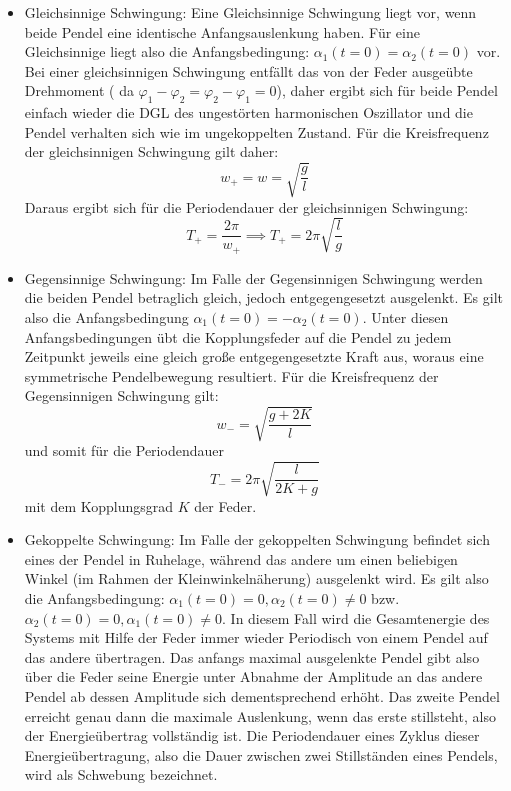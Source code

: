\begin{itemize}
\item Gleichsinnige Schwingung: \newline
Eine Gleichsinnige Schwingung liegt vor, wenn beide Pendel eine identische Anfangsauslenkung haben. Für eine Gleichsinnige liegt also die Anfangsbedingung: $\alpha_1(t=0)=\alpha_2(t=0)$ vor. Bei einer gleichsinnigen Schwingung entfällt das von der Feder ausgeübte Drehmoment ( da $\varphi_1-\varphi_2=\varphi_2-\varphi_1=0$), daher ergibt sich für beide Pendel einfach wieder die DGL des ungestörten harmonischen Oszillator und die Pendel verhalten sich wie im ungekoppelten Zustand. Für die Kreisfrequenz der gleichsinnigen Schwingung gilt daher:
\begin{equation}
w_+=w=\sqrt{\frac{g}{l}}
\end{equation}
Daraus ergibt sich für die Periodendauer der gleichsinnigen Schwingung:
\begin{equation}
T_+=\frac{2\pi}{w_+} \implies T_+=2\pi\sqrt{\frac{l}{g}}
\end{equation}
\item Gegensinnige Schwingung: \newline
Im Falle der Gegensinnigen Schwingung werden die beiden Pendel betraglich gleich, jedoch entgegengesetzt ausgelenkt. Es gilt also die Anfangsbedingung $\alpha_1(t=0)=-\alpha_2(t=0)$. Unter diesen Anfangsbedingungen übt die Kopplungsfeder auf die Pendel zu jedem Zeitpunkt jeweils eine gleich große entgegengesetzte Kraft aus, woraus eine symmetrische Pendelbewegung resultiert. Für die Kreisfrequenz der Gegensinnigen Schwingung gilt:
\begin{equation}
w_-=\sqrt{\frac{g+2K}{l}}
\end{equation}
und somit für die Periodendauer
\begin{equation}
T_-=2\pi\sqrt{\frac{l}{2K+g}}
\end{equation}
mit dem Kopplungsgrad $K$ der Feder.
\item Gekoppelte Schwingung: \newline
Im Falle der gekoppelten Schwingung befindet sich eines der Pendel in Ruhelage, während das andere um einen beliebigen Winkel (im Rahmen der Kleinwinkelnäherung) ausgelenkt wird. Es gilt also die Anfangsbedingung: $\alpha_1(t=0)=0,\alpha_2(t=0)\neq0$ bzw. $\alpha_2(t=0)=0,\alpha_1(t=0)\neq0$. In diesem Fall wird die Gesamtenergie des Systems mit Hilfe der Feder immer wieder Periodisch von einem Pendel auf das andere übertragen. Das anfangs maximal ausgelenkte Pendel gibt also über die Feder seine Energie unter Abnahme der Amplitude an das andere Pendel ab dessen Amplitude sich dementsprechend erhöht. Das zweite Pendel erreicht genau dann die maximale Auslenkung, wenn das erste stillsteht, also der Energieübertrag vollständig ist. Die Periodendauer eines Zyklus dieser Energieübertragung, also die Dauer zwischen zwei Stillständen eines Pendels, wird als Schwebung bezeichnet. \newline

\end{itemize}
